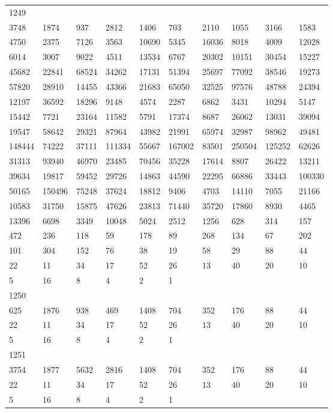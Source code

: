 \begin{longtable}{*{10}{l}}
1249&&&&&&&&&\\
3748& 1874& 937& 2812& 1406& 703& 2110& 1055& 3166& 1583\\
4750& 2375& 7126& 3563& 10690& 5345& 16036& 8018& 4009& 12028\\
6014& 3007& 9022& 4511& 13534& 6767& 20302& 10151& 30454& 15227\\
45682& 22841& 68524& 34262& 17131& 51394& 25697& 77092& 38546& 19273\\
57820& 28910& 14455& 43366& 21683& 65050& 32525& 97576& 48788& 24394\\
12197& 36592& 18296& 9148& 4574& 2287& 6862& 3431& 10294& 5147\\
15442& 7721& 23164& 11582& 5791& 17374& 8687& 26062& 13031& 39094\\
19547& 58642& 29321& 87964& 43982& 21991& 65974& 32987& 98962& 49481\\
148444& 74222& 37111& 111334& 55667& 167002& 83501& 250504& 125252& 62626\\
31313& 93940& 46970& 23485& 70456& 35228& 17614& 8807& 26422& 13211\\
39634& 19817& 59452& 29726& 14863& 44590& 22295& 66886& 33443& 100330\\
50165& 150496& 75248& 37624& 18812& 9406& 4703& 14110& 7055& 21166\\
10583& 31750& 15875& 47626& 23813& 71440& 35720& 17860& 8930& 4465\\
13396& 6698& 3349& 10048& 5024& 2512& 1256& 628& 314& 157\\
472& 236& 118& 59& 178& 89& 268& 134& 67& 202\\
101& 304& 152& 76& 38& 19& 58& 29& 88& 44\\
22& 11& 34& 17& 52& 26& 13& 40& 20& 10\\
5& 16& 8& 4& 2& 1& \\

1250&&&&&&&&&\\
625& 1876& 938& 469& 1408& 704& 352& 176& 88& 44\\
22& 11& 34& 17& 52& 26& 13& 40& 20& 10\\
5& 16& 8& 4& 2& 1& \\

1251&&&&&&&&&\\
3754& 1877& 5632& 2816& 1408& 704& 352& 176& 88& 44\\
22& 11& 34& 17& 52& 26& 13& 40& 20& 10\\
5& 16& 8& 4& 2& 1& \\


\end{longtable}
